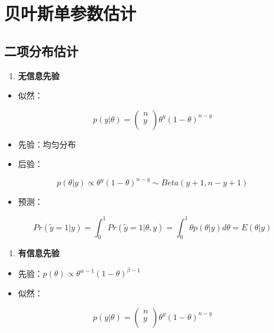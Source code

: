 \section{贝叶斯单参数估计}
\subsection{二项分布估计}

\begin{enumerate}
\def\labelenumi{\arabic{enumi}.}
\item
  \textbf{无信息先验}
\end{enumerate}

\begin{itemize}
\item
  似然：
\end{itemize}

\begin{equation} 
p(y|\theta)=
\left(                 
  \begin{array}{ccc}   
    n\\ 
    y\\  
  \end{array}
\right)                 
\theta^y(1-\theta)^{n-y}
\end{equation}

\begin{itemize}
\item
  先验：均匀分布
\item
  后验：
\end{itemize}

\begin{equation}
  p(\theta|y)\propto\theta^y(1-\theta)^{n-y}\sim Beta(y+1,n-y+1)
\end{equation}

\begin{itemize}
\item
  预测：
\end{itemize}

\begin{equation}
  Pr(\widetilde y=1|y)=\int_0^1Pr(\widetilde y=1|\theta,y)
  =\int_0^1\theta p(\theta|y)d\theta=E(\theta|y)
\end{equation}

\begin{enumerate}
\def\labelenumi{\arabic{enumi}.}
\item
  \textbf{有信息先验}
\end{enumerate}

\begin{itemize}
\item
  先验：\(p(\theta)\propto \theta^{\alpha-1}(1-\theta)^{\beta-1}\)
\item
  似然：
\end{itemize}
\begin{equation}      
p(y|\theta)=
\left(                 
  \begin{array}{ccc}   
    n\\ 
    y\\  
  \end{array}
\right)                 
\theta^y(1-\theta)^{n-y}
\end{equation}

